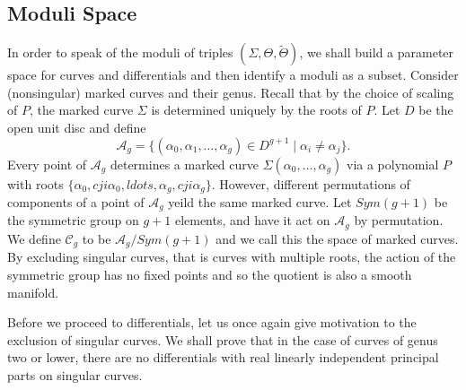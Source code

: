 \notoc\subsection{Moduli Space}

In order to speak of the moduli of triples $(Σ,Θ,\tilde{Θ})$, we shall build a parameter space for curves and differentials and then identify a moduli as a subset. Consider (nonsingular) marked curves and their genus. Recall that by the choice of scaling of $P$, the marked curve $Σ$ is determined uniquely by the roots of $P$. Let $D$ be the open unit disc and define
\[
\mathcal{A}_g = \{ (α_0, α_1, \ldots, α_g) \in D^{g+1} \mid α_i \neq α_j \}.
\]
Every point of $\mathcal{A}_g$ determines a marked curve $Σ(α_0,\ldots,α_g)$ via a polynomial $P$ with roots $\{α_0,cji{α}_0,ldots,α_g,cji{α}_g\}$. However, different permutations of components of a point of $\mathcal{A}_g$ yeild the same marked curve. Let $Sym(g+1)$ be the symmetric group on $g+1$ elements, and have it act on $\mathcal{A}_g$ by permutation. We define $\mathcal{C}_g$ to be $\mathcal{A}_g / Sym(g+1)$ and we call this the space of marked curves. By excluding singular curves, that is curves with multiple roots, the action of the symmetric group has no fixed points and so the quotient is also a smooth manifold.

Before we proceed to differentials, let us once again give motivation to the exclusion of singular curves. We shall prove that in the case of curves of genus two or lower, there are no differentials with real linearly independent principal parts on singular curves.

